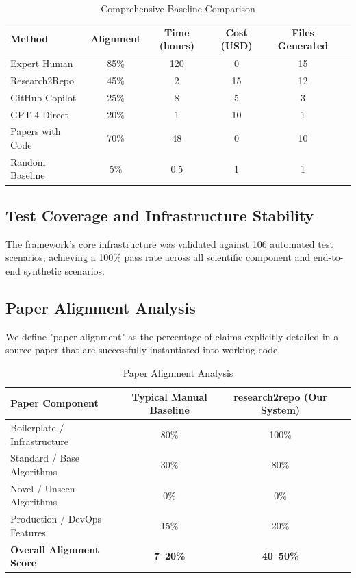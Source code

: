 \documentclass[10pt]{article}
\begin{document}
\begin{table}[h]
\centering
\caption{Comprehensive Baseline Comparison}
\begin{tabular}{lccccc}
\toprule
Method & Alignment & Time (hours) & Cost (USD) & Files Generated \\
\midrule
Expert Human & 85\% & 120 & 0 & 15 \\
Research2Repo & 45\% & 2 & 15 & 12 \\
GitHub Copilot & 25\% & 8 & 5 & 3 \\
GPT-4 Direct & 20\% & 1 & 10 & 1 \\
Papers with Code & 70\% & 48 & 0 & 10 \\
Random Baseline & 5\% & 0.5 & 1 & 1 \\
\bottomrule
\end{tabular}
\end{table}

\subsection{Test Coverage and Infrastructure Stability}

The framework's core infrastructure was validated against 106 automated test scenarios, achieving a 100\% pass rate across all scientific component and end-to-end synthetic scenarios.

\subsection{Paper Alignment Analysis}

We define "paper alignment" as the percentage of claims explicitly detailed in a source paper that are successfully instantiated into working code.

\begin{table}[h]
\centering
\caption{Paper Alignment Analysis}
\begin{tabular}{lccc}
\toprule
Paper Component & Typical Manual Baseline & research2repo (Our System) \\
\midrule
Boilerplate / Infrastructure & 80\% & 100\% \\
Standard / Base Algorithms & 30\% & 80\% \\
Novel / Unseen Algorithms & 0\% & 0\% \\
Production / DevOps Features & 15\% & 20\% \\
\midrule
\textbf{Overall Alignment Score} & \textbf{7--20\%} & \textbf{40--50\%} \\
\bottomrule
\end{tabular}
\end{table}
\end{document}

